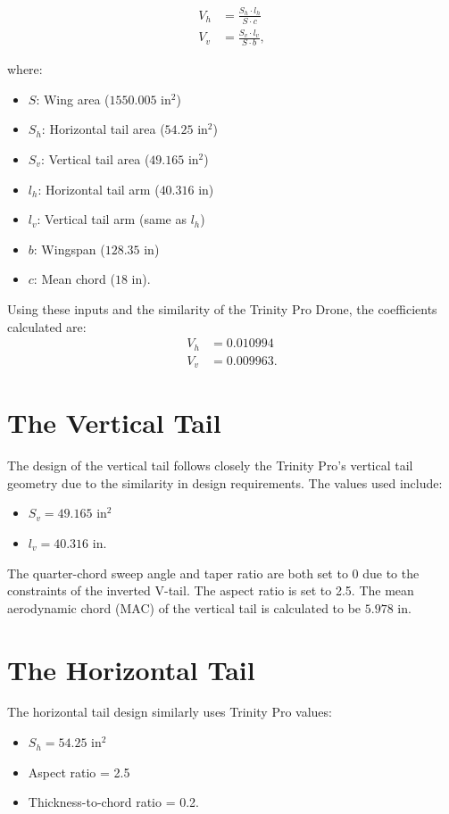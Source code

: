 \documentclass[12pt]{report}
\begin{document}
	\begin{align}
		V_h &= \frac{S_h \cdot l_h}{S \cdot c} \\
		V_v &= \frac{S_v \cdot l_v}{S \cdot b},
	\end{align}
	
	where:
	\begin{itemize}
		\item $S$: Wing area ($1550.005$ in\(^2\))
		\item $S_h$: Horizontal tail area ($54.25$ in\(^2\))
		\item $S_v$: Vertical tail area ($49.165$ in\(^2\))
		\item $l_h$: Horizontal tail arm ($40.316$ in)
		\item $l_v$: Vertical tail arm (same as $l_h$)
		\item $b$: Wingspan ($128.35$ in)
		\item $c$: Mean chord ($18$ in).
	\end{itemize}
	
	Using these inputs and the similarity of the Trinity Pro Drone, the coefficients calculated are:
	\begin{align}
		V_h &= 0.010994 \\
		V_v &= 0.009963.
	\end{align}
	
	\section{The Vertical Tail}
	
	The design of the vertical tail follows closely the Trinity Pro's vertical tail geometry due to the similarity in design requirements. The values used include:
	\begin{itemize}
		\item $S_v = 49.165$ in\(^2\)
		\item $l_v = 40.316$ in.
	\end{itemize}
	
	The quarter-chord sweep angle and taper ratio are both set to 0 due to the constraints of the inverted V-tail. The aspect ratio is set to 2.5. The mean aerodynamic chord (MAC) of the vertical tail is calculated to be $5.978$ in.
	
	\section{The Horizontal Tail}
	
	The horizontal tail design similarly uses Trinity Pro values:
	\begin{itemize}
		\item $S_h = 54.25$ in\(^2\)
		\item Aspect ratio = 2.5
		\item Thickness-to-chord ratio = 0.2.
	\end{itemize}
	
\end{document}

